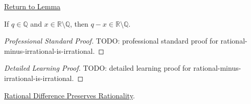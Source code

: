 \newpage
{}
\label{prf:rational-minus-irrational-is-irrational}

\begin{remark*}[Return]
\hyperref[lem:rational-minus-irrational-is-irrational]{Return to Lemma}
\end{remark*}

\begin{lemma*}
If $q\in\mathbb{Q}$ and $x\in\mathbb{R}\setminus\mathbb{Q}$, then
$q-x\in\mathbb{R}\setminus\mathbb{Q}$.
\end{lemma*}

\begin{proof}[Professional Standard Proof]
\LRAProofBodyStart
TODO: professional standard proof for rational-minus-irrational-is-irrational.
\end{proof}

\begin{proof}[Detailed Learning Proof]
\LRAProofBodyStart
TODO: detailed learning proof for rational-minus-irrational-is-irrational.
\end{proof}

\begin{remark*}
\end{remark*}

\begin{dependencies}
\hyperref[lem:rational-difference-preserves-rationality]{Rational Difference Preserves Rationality}.
\end{dependencies}

\clearpage
